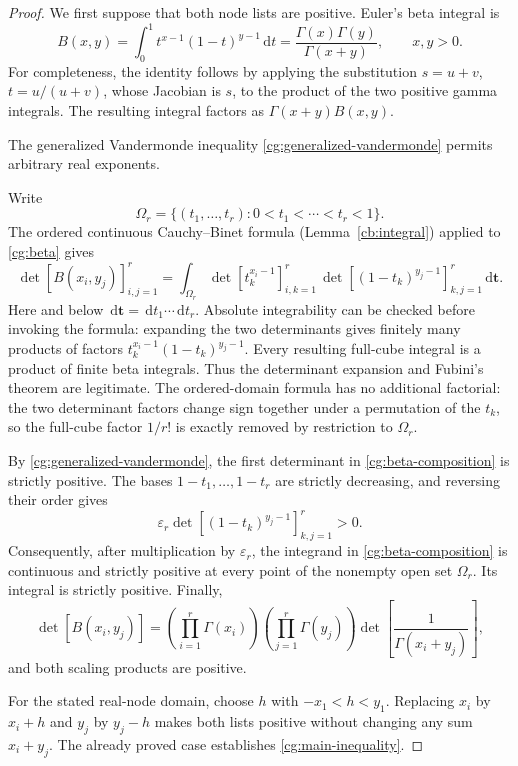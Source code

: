 \documentclass[11pt,a4paper]{article}
\theoremstyle{definition}
\theoremstyle{remark}
\newcommand{\dd}{\,\mathrm d}
\newcommand{\ep}{\varepsilon}
\begin{document}
\begin{proof}
We first suppose that both node lists are positive. Euler's beta integral
is
\begin{equation}\label{cg:beta}
 B(x,y)=\int_0^1 t^{x-1}(1-t)^{y-1}\dd t
       =\frac{\Gamma(x)\Gamma(y)}{\Gamma(x+y)},\qquad x,y>0.
\end{equation}
For completeness, the identity follows by applying the substitution
\(s=u+v\), \(t=u/(u+v)\), whose Jacobian is \(s\), to the product of the
two positive gamma integrals. The resulting integral factors as
\(\Gamma(x+y)B(x,y)\).

The generalized Vandermonde inequality
\eqref{cg:generalized-vandermonde} permits arbitrary real exponents.

Write
\[
 \Omega_r=\{(t_1,\ldots,t_r):0<t_1<\cdots<t_r<1\}.
\]
The ordered continuous Cauchy--Binet formula
(Lemma~\ref{cb:integral}) applied to \eqref{cg:beta} gives
\begin{equation}\label{cg:beta-composition}
 \det[B(x_i,y_j)]_{i,j=1}^{r}
 =
 \int_{\Omega_r}
   \det[t_k^{x_i-1}]_{i,k=1}^{r}\,
   \det[(1-t_k)^{y_j-1}]_{k,j=1}^{r}
   \dd\mathbf t .
\end{equation}
Here and below \(\dd\mathbf t=\dd t_1\cdots\dd t_r\).
Absolute integrability can be checked before invoking the formula:
expanding the two determinants gives finitely many products of factors
\(t_k^{x_i-1}(1-t_k)^{y_j-1}\).
Every resulting full-cube integral is a product of finite beta
integrals. Thus the determinant expansion and Fubini's theorem are
legitimate. The ordered-domain formula has no additional factorial:
the two determinant factors change sign together under a permutation of
the \(t_k\), so the full-cube factor \(1/r!\) is exactly removed by
restriction to \(\Omega_r\).

By \eqref{cg:generalized-vandermonde}, the first determinant in
\eqref{cg:beta-composition} is strictly positive. The bases
\(1-t_1,\ldots,1-t_r\) are strictly decreasing, and reversing their
order gives
\[
 \ep_r\det[(1-t_k)^{y_j-1}]_{k,j=1}^{r}>0.
\]
Consequently, after multiplication by \(\ep_r\), the integrand in
\eqref{cg:beta-composition} is continuous and strictly positive at every
point of the nonempty open set \(\Omega_r\). Its integral is strictly
positive. Finally,
\begin{equation}\label{cg:beta-scaling}
 \det[B(x_i,y_j)]
 =
 \left(\prod_{i=1}^{r}\Gamma(x_i)\right)
 \left(\prod_{j=1}^{r}\Gamma(y_j)\right)
 \det\left[\frac1{\Gamma(x_i+y_j)}\right],
\end{equation}
and both scaling products are positive.

For the stated real-node domain, choose \(h\) with
\(-x_1<h<y_1\). Replacing \(x_i\) by \(x_i+h\) and \(y_j\) by \(y_j-h\)
makes both lists positive without changing any sum \(x_i+y_j\).
The already proved case establishes \eqref{cg:main-inequality}.
\end{proof}
\end{document}
